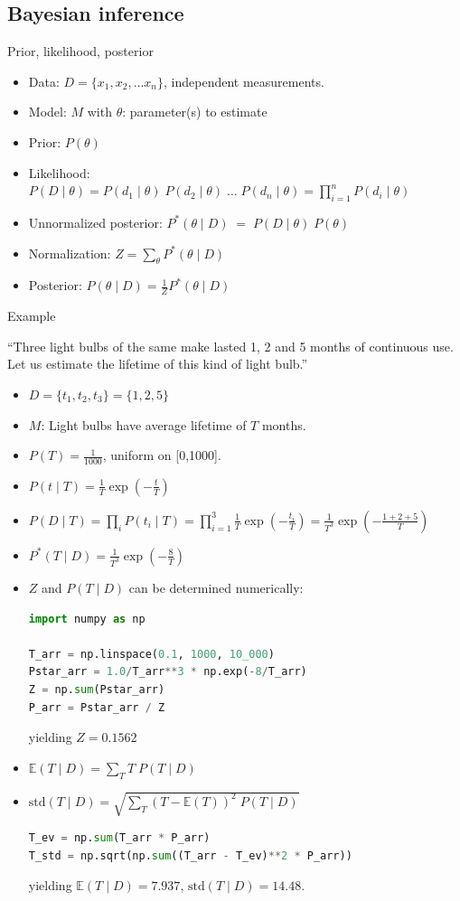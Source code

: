 \subsection{Bayesian inference}
\no Prior, likelihood, posterior
\begin{itemize}
	\item Data: $D = \{x_1, x_2, \ldots x_n\}$, independent measurements.
	\item Model: $M$ with $\theta$: parameter(s) to estimate
	\item Prior: $P(\theta)$
	\item Likelihood: $P(D\;|\;\theta) = P(d_1\;|\;\theta) \;P(d_2\;|\;\theta)\;\ldots \;P(d_n\;|\;\theta) = \prod_{i=1}^n P(d_i\;|\;\theta)$
	\item Unnormalized posterior: $P^\ast(\theta\;|\;D) \;=\; P(D\;|\;\theta) \;P(\theta)$
	\item Normalization: $Z = \sum_\theta P^\ast(\theta\;|\;D)$
	\item Posterior: $P(\theta\;|\;D) = \frac{1}{Z} P^\ast(\theta\;|\;D)$
\end{itemize}
Example

``Three light bulbs of the same make lasted 1, 2 and 5 months of continuous use. Let us estimate the lifetime of this kind of light bulb.''
\begin{itemize}
	\item $D = \{t_1, t_2, t_3\} = \{1,2,5\}$
	\item $M$: Light bulbs have average lifetime of $T$ months.
	\item $P(T) = \frac{1}{1000}$, uniform on [0,1000].
	\item $P(t\;|\;T) = \frac{1}{T}\exp\left(-\frac{t}{T}\right)$
	\item $P(D\;|\;T) = \prod_i P(t_i\;|\; T) = \prod_{i=1}^3 \frac{1}{T}\exp\left(-\frac{t_i}{T}\right) = \frac{1}{T^3} \exp\left(-\frac{1 + 2 + 5}{T}\right)$
	\item $P^\ast(T\;|\;D) = \frac{1}{T^3} \exp\left(-\frac{8}{T}\right)$
	\item $Z$ and  $P(T\;|\;D)$ can be determined numerically:
\begin{lstlisting}[language=python]
import numpy as np

T_arr = np.linspace(0.1, 1000, 10_000)
Pstar_arr = 1.0/T_arr**3 * np.exp(-8/T_arr)
Z = np.sum(Pstar_arr)
P_arr = Pstar_arr / Z
\end{lstlisting}
	yielding $Z = 0.1562$
	\item $\mathbb{E}(T\;|\;D) = \sum_T T \;P(T\;|\;D)$ 
	\item $\text{std}(T\;|\;D) = \sqrt{\sum_T (T - \mathbb{E}(T))^2 \; P(T\;|\;D)}$
\begin{lstlisting}[language=python]
T_ev = np.sum(T_arr * P_arr)
T_std = np.sqrt(np.sum((T_arr - T_ev)**2 * P_arr))
\end{lstlisting}
	yielding $\mathbb{E}(T\;|\;D) = 7.937$, \quad $\text{std}(T\;|\;D) = 14.48$.
\end{itemize}


